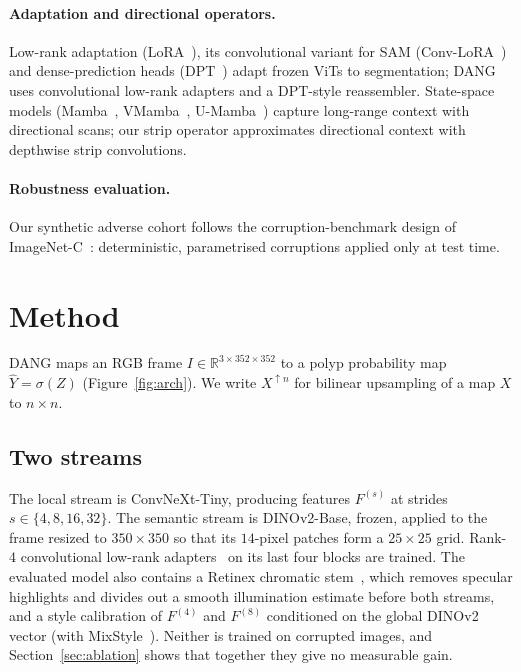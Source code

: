 \documentclass[10pt,twocolumn]{article}
\begin{document}
\paragraph{Adaptation and directional operators.} Low-rank adaptation (LoRA~\citep{hu2022lora}), its convolutional variant for SAM (Conv-LoRA~\citep{zhong2024convlora}) and dense-prediction heads (DPT~\citep{ranftl2021vision}) adapt frozen ViTs to segmentation; DANG uses convolutional low-rank adapters and a DPT-style reassembler. State-space models (Mamba~\citep{gu2023mamba}, VMamba~\citep{liu2024vmamba}, U-Mamba~\citep{ma2024umamba}) capture long-range context with directional scans; our strip operator approximates directional context with depthwise strip convolutions.

\paragraph{Robustness evaluation.} Our synthetic adverse cohort follows the corruption-benchmark design of ImageNet-C~\citep{hendrycks2019benchmarking}: deterministic, parametrised corruptions applied only at test time.

\section{Method}
DANG maps an RGB frame $I\in\mathbb{R}^{3\times352\times352}$ to a polyp probability map $\hat Y=\sigma(Z)$ (Figure~\ref{fig:arch}). We write $X^{\uparrow n}$ for bilinear upsampling of a map $X$ to $n\times n$.

\subsection{Two streams}
\label{sec:stem}
The local stream is ConvNeXt-Tiny, producing features $F^{(s)}$ at strides $s\in\{4,8,16,32\}$. The semantic stream is DINOv2-Base, frozen, applied to the frame resized to $350\times350$ so that its $14$-pixel patches form a $25\times25$ grid. Rank-$4$ convolutional low-rank adapters~\citep{zhong2024convlora} on its last four blocks are trained. The evaluated model also contains a Retinex chromatic stem~\citep{land1971lightness}, which removes specular highlights and divides out a smooth illumination estimate before both streams, and a style calibration of $F^{(4)}$ and $F^{(8)}$ conditioned on the global DINOv2 vector (with MixStyle~\citep{zhou2021mixstyle}). Neither is trained on corrupted images, and Section~\ref{sec:ablation} shows that together they give no measurable gain.
\end{document}
